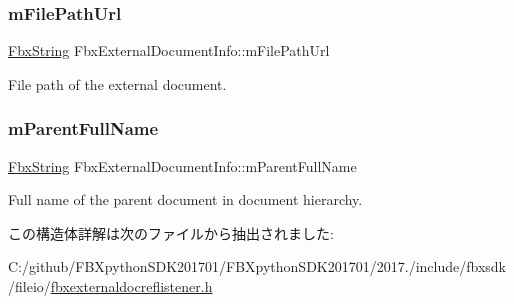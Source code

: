 \subsubsection{\texorpdfstring{m\+File\+Path\+Url}{mFilePathUrl}}
{\footnotesize\ttfamily \hyperlink{class_fbx_string}{Fbx\+String} Fbx\+External\+Document\+Info\+::m\+File\+Path\+Url}



File path of the external document. 

\mbox{\label{struct_fbx_external_document_info_ae677004de679e0106dcfea163f36079c}} 
\subsubsection{\texorpdfstring{m\+Parent\+Full\+Name}{mParentFullName}}
{\footnotesize\ttfamily \hyperlink{class_fbx_string}{Fbx\+String} Fbx\+External\+Document\+Info\+::m\+Parent\+Full\+Name}



Full name of the parent document in document hierarchy. 



この構造体詳解は次のファイルから抽出されました\+:\begin{DoxyCompactItemize}
\item 
C\+:/github/\+F\+B\+Xpython\+S\+D\+K201701/\+F\+B\+Xpython\+S\+D\+K201701/2017./include/fbxsdk/fileio/\hyperlink{fbxexternaldocreflistener_8h}{fbxexternaldocreflistener.\+h}\end{DoxyCompactItemize}
